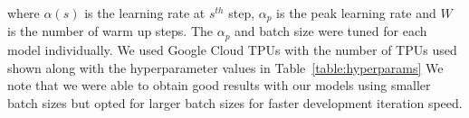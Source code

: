 \documentclass{article}
\begin{document}
where $\alpha(s)$ is the learning rate at $s^{th}$ step, $\alpha_p$ is the peak learning rate and $W$ is the number of warm up steps. The $\alpha_p$ and batch size were tuned for each model individually. We used Google Cloud TPUs with the number of TPUs used shown along with the hyperparameter values in Table~\ref{table:hyperparams} We note that we were able to obtain good results with our models using smaller batch sizes but opted for larger batch sizes for faster development iteration speed.
\end{document}
